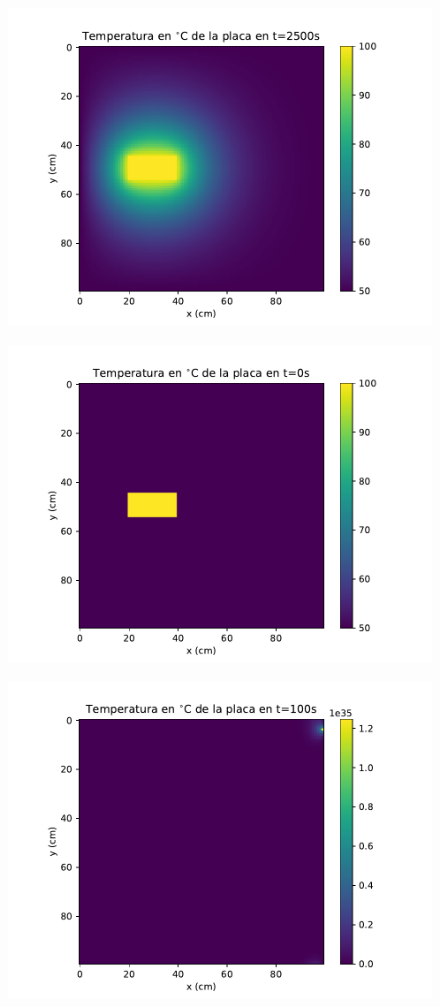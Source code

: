 \documentclass[12pt,letterpaper]{article}
\begin{document}
\begin{figure}[ht]
\includegraphics{f2_2500.pdf}
\centering
\end{figure}

\begin{figure}[ht]
\includegraphics{a1_0.pdf}
\centering
\end{figure}

\begin{figure}[ht]
\includegraphics{a1_100.pdf}
\centering
\end{figure}
\end{document}
